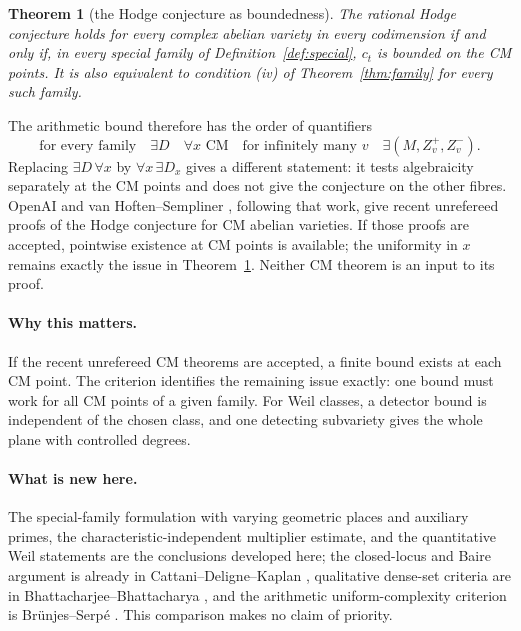 \documentclass[11pt]{article}
\newtheorem{theorem}{Theorem}[section]
\theoremstyle{definition}
\theoremstyle{remark}
\begin{document}
\begin{theorem}[the Hodge conjecture as boundedness]\label{thm:global}
The rational Hodge conjecture holds for every complex abelian variety in every codimension if and only if, in every special family of Definition~\ref{def:special}, $c_t$ is bounded on the CM points. It is also equivalent to condition \textnormal{(iv)} of Theorem~\ref{thm:family} for every such family.
\end{theorem}

The arithmetic bound therefore has the order of quantifiers
\[
 \text{for every family}\quad\exists D\quad\forall x\text{ CM}
 \quad\text{for infinitely many }v\quad\exists(M,Z_v^+,Z_v^-).
\]
Replacing $\exists D\,\forall x$ by $\forall x\,\exists D_x$ gives a different statement: it tests algebraicity separately at the CM points and does not give the conjecture on the other fibres. OpenAI \cite[Theorem~1.1]{OpenAICM} and van Hoften--Sempliner \cite[Theorem~I]{vHS}, following that work, give recent unrefereed proofs of the Hodge conjecture for CM abelian varieties. If those proofs are accepted, pointwise existence at CM points is available; the uniformity in $x$ remains exactly the issue in Theorem~\ref{thm:global}. Neither CM theorem is an input to its proof.


\paragraph{Why this matters.}
If the recent unrefereed CM theorems are accepted, a finite bound exists
at each CM point. The criterion identifies the remaining issue exactly:
one bound must work for all CM points of a given family. For Weil
classes, a detector bound is independent of the chosen class, and
one detecting subvariety gives the whole plane with controlled degrees.

\paragraph{What is new here.}
The special-family formulation with varying geometric places and
auxiliary primes, the characteristic-independent multiplier estimate,
and the quantitative Weil statements are the conclusions developed
here; the closed-locus and Baire argument is already in
Cattani--Deligne--Kaplan \cite[p.~483]{CDK}, qualitative dense-set
criteria are in Bhattacharjee--Bhattacharya
\cite[Lemmas~4.2--4.3 and Theorem~4.5, pp.~10--12]{BBDense},
and the arithmetic uniform-complexity criterion is
Br\"unjes--Serp\'e \cite[Theorem~3.4, p.~8]{BS}.
This comparison makes no claim of priority.
\end{document}
